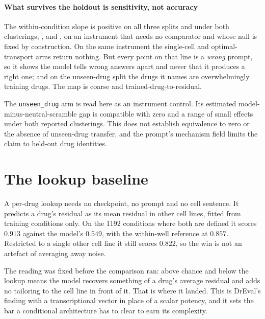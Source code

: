 \paragraph{What survives the holdout is sensitivity, not accuracy} The
within-condition slope is positive on all three splits and under both
clusterings, ,  and
, on an instrument that needs no comparator and whose
null is fixed by construction. On the same instrument the single-cell and
optimal-transport arms return nothing. But every point on that line is a
\emph{wrong} prompt, so it shows the model tells wrong answers apart and never
that it produces a right one; and on the unseen-drug split the drugs it names are
overwhelmingly training drugs. The map is coarse and trained-drug-to-residual.

\begin{scopelimit}
The \texttt{unseen\_drug} arm is read here as an instrument control. Its
estimated model-minus-neutral-scramble gap is compatible with zero and a range
of small effects under both reported clusterings. This does not establish
equivalence to zero or the absence of unseen-drug transfer, and the prompt's
mechanism field limits the claim to held-out drug identities.
\end{scopelimit}

\section{The lookup baseline}

A per-drug lookup needs no checkpoint, no prompt and no cell
sentence. It predicts a drug's residual as its mean residual in other cell
lines, fitted from training conditions only. On the $\num{1192}$ conditions where
both are defined it scores $0.913$ against the model's $0.549$, with the
within-well reference at $0.857$. Restricted to a single other cell line it still
scores $0.822$, so the win is not an artefact of averaging away noise.

The reading was fixed before the comparison ran: above chance and below the
lookup means the model recovers something of a drug's average residual and adds
no tailoring to the cell line in front of it. That is where it landed. This is
DrEval's finding with a transcriptional vector in place of a scalar potency, and
it sets the bar a conditional architecture has to clear to earn its complexity.

